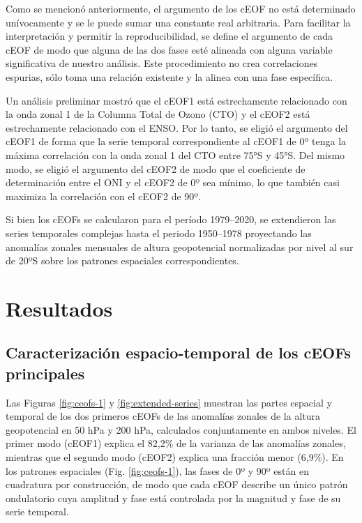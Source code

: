 \documentclass[12pt,oneside,a4paper]{reedthesis}
\begin{document}
Como se mencionó anteriormente, el argumento de los cEOF no está determinado unívocamente y se le puede sumar una constante real arbitraria.
Para facilitar la interpretación y permitir la reproducibilidad, se define el argumento de cada cEOF de modo que alguna de las dos fases esté alineada con alguna variable significativa de nuestro análisis.
Este procedimiento no crea correlaciones espurias, sólo toma una relación existente y la alinea con una fase específica.

Un análisis preliminar mostró que el cEOF1 está estrechamente relacionado con la onda zonal 1 de la Columna Total de Ozono (CTO) y el cEOF2 está estrechamente relacionado con el ENSO.
Por lo tanto, se eligió el argumento del cEOF1 de forma que la serie temporal correspondiente al cEOF1 de 0º tenga la máxima correlación con la onda zonal 1 del CTO entre 75°S y 45°S.
Del mismo modo, se eligió el argumento del cEOF2 de modo que el coeficiente de determinación entre el ONI y el cEOF2 de 0º sea mínimo, lo que también casi maximiza la correlación con el cEOF2 de 90º.

Si bien los cEOFs se calcularon para el período 1979--2020, se extendieron las series temporales complejas hasta el periodo 1950--1978 proyectando las anomalías zonales mensuales de altura geopotencial normalizadas por nivel al sur de 20ºS sobre los patrones espaciales correspondientes.

\hypertarget{resultados-1}{%
\section{Resultados}\label{resultados-1}}

\hypertarget{caracterizaciuxf3n-espacio-temporal-de-los-ceofs-principales}{%
\subsection{Caracterización espacio-temporal de los cEOFs principales}\label{caracterizaciuxf3n-espacio-temporal-de-los-ceofs-principales}}

Las Figuras \ref{fig:ceofs-1} y \ref{fig:extended-series} muestran las partes espacial y temporal de los dos primeros cEOFs de las anomalías zonales de la altura geopotencial en 50 hPa y 200 hPa, calculados conjuntamente en ambos niveles.
El primer modo (cEOF1) explica el 82,2\% de la varianza de las anomalías zonales, mientras que el segundo modo (cEOF2) explica una fracción menor (6,9\%).
En los patrones espaciales (Fig. \ref{fig:ceofs-1}), las fases de 0º y 90º están en cuadratura por construcción, de modo que cada cEOF describe un único patrón ondulatorio cuya amplitud y fase está controlada por la magnitud y fase de su serie temporal.
\end{document}
